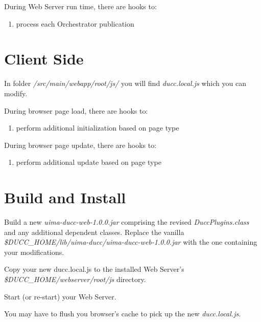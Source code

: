     During Web Server run time, there are hooks to:
    
	\begin{enumerate}
      \item process each Orchestrator publication
    \end{enumerate}
    
\section{Client Side}

	In folder {\em /src/main/webapp/root/js/} you will find 
	{\em ducc.local.js} which you can modify.
	
	During browser page load, there are hooks to:
	
	\begin{enumerate}
      \item perform additional initialization based on page type
    \end{enumerate}

	During browser page update, there are hooks to:
	
	\begin{enumerate}
      \item perform additional update based on page type
    \end{enumerate}
    
\section{Build and Install}   

	Build a new {\em uima-ducc-web-1.0.0.jar} comprising the revised
	{\em DuccPlugins.class} and any additional dependent classes.
	Replace the vanilla {\em \$DUCC\_HOME/lib/uima-ducc/uima-ducc-web-1.0.0.jar} 
	with the one containing your modifications.

	Copy your new ducc.local.js to the installed Web Server's 
	{\em \$DUCC\_HOME/webserver/root/js} directory.
	
	Start (or re-start) your Web Server.
	
	You may have to flush you browser's cache to pick up the new {\em ducc.local.js}.
	
	
	
	
	